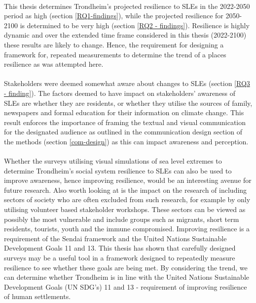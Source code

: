 \paragraph{}
This thesis determines Trondheim's projected resilience to SLEs in the 2022-2050 period as high (section \ref{RQ1-findings}), while the projected resilience for 2050-2100 is determined to be very high (section \ref{RQ2 - findings}). Resilience is highly dynamic and over the extended time frame considered in this thesis (2022-2100) these results are likely to change. Hence, the requirement for designing a framework for, repeated measurements to determine the trend of a places resilience as was attempted here. 

\paragraph{}
Stakeholders were deemed somewhat aware about changes to SLEs (section \ref{RQ3 - finding}). The factors deemed to have impact on stakeholders' awareness of SLEs are whether they are residents, or whether they utilise the sources of family, newspapers and formal education for their information on climate change. This result enforces the importance of framing the textual and visual communication for the designated audience as outlined in the communication design section of the methods (section \ref{com-design}) as this can impact awareness and perception.  
\paragraph{}


Whether the surveys utilising visual simulations of sea level extremes to determine Trondheim's social system resilience to SLEs can also be used to improve awareness, hence improving resilience, would be an interesting avenue for future research. Also worth looking at is the impact on the research of including sectors of society who are often excluded from such research, for example by only utilising volunteer based stakeholder workshops. These sectors can be viewed as possibly the most vulnerable and include groups such as migrants, short term residents, tourists, youth and the immune compromised. Improving resilience is a requirement of the Sendai framework and the United Nations Sustainable Development Goals 11 and 13. This thesis has shown that carefully designed surveys may be a useful tool in a framework designed to repeatedly measure resilience to see whether these goals are being met. By considering the trend, we can determine whether Trondheim is in line with the United Nations Sustainable Development Goals (UN SDG’s) 11 and 13 - requirement of improving resilience of human settlements.


